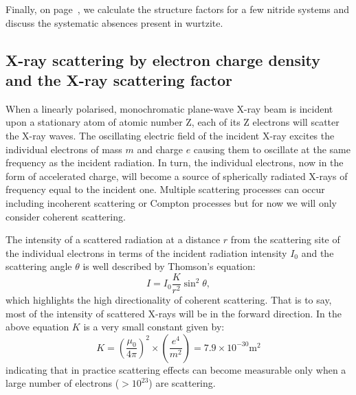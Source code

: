  Finally, on page~\pageref{sec:SF_GAN}, we calculate the structure factors for a few nitride systems and discuss the systematic absences present in wurtzite. 





\subsection{X-ray scattering by electron charge density and the X-ray scattering factor}

When a linearly polarised, monochromatic plane-wave X-ray beam is incident upon a stationary atom of atomic number Z, each of its Z electrons will scatter the X-ray waves. The oscillating electric field of the incident X-ray excites the individual electrons of mass $m$ and charge $e$ causing them to oscillate at the same frequency as the incident radiation. In turn, the individual electrons, now in the form of accelerated charge, will become a source of spherically radiated X-rays of frequency equal to the incident one. Multiple scattering processes can occur including incoherent scattering or Compton processes but for now we will only consider coherent scattering.


The intensity of a scattered radiation at a distance $r$ from the scattering site of the individual electrons in terms of the incident radiation intensity $I_0$ and the scattering angle $\theta$ is well described by Thomson's equation:
\begin{equation}
I = I_0 \frac{K}{r^2}\sin^2 {\theta},
\end{equation}
which highlights the high directionality of coherent scattering. That is to say, most of the intensity of scattered X-rays will be in the forward direction. In the above equation $K$ is a very small constant given by:
\begin{equation*}
K = \left( \frac{\mu_0}{4 \pi} \right)^2 \times \left( \frac{e^4}{m^2} \right) = 7.9 \times 10^{-30} \si{\meter}^2
\end{equation*}
indicating that in practice scattering effects can become measurable only when a large number of electrons ($ > 10^{23}$) are scattering.

